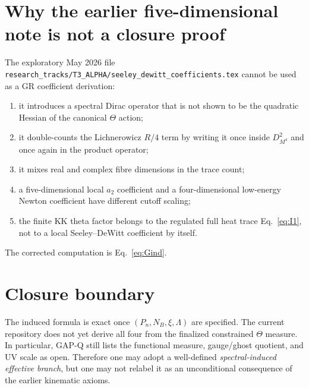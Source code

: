 \documentclass[11pt,a4paper]{article}
\begin{document}
\section{Why the earlier five-dimensional note is not a closure proof}
The exploratory May 2026 file
\texttt{research\_tracks/T3\_ALPHA/seeley\_dewitt\_coefficients.tex} cannot be
used as a GR coefficient derivation:
\begin{enumerate}
 \item it introduces a spectral Dirac operator that is not shown to be the
 quadratic Hessian of the canonical $\Theta$ action;
 \item it double-counts the Lichnerowicz $R/4$ term by writing it once inside
 $D_{M^4}^2$ and once again in the product operator;
 \item it mixes real and complex fibre dimensions in the trace count;
 \item a five-dimensional local $a_2$ coefficient and a four-dimensional
 low-energy Newton coefficient have different cutoff scaling;
 \item the finite KK theta factor belongs to the regulated full heat trace
 Eq.~\eqref{eq:I1}, not to a local Seeley--DeWitt coefficient by itself.
\end{enumerate}
The corrected computation is Eq.~\eqref{eq:Gind}.

\section{Closure boundary}
The induced formula is exact once $(P_n,N_B,\xi,\Lambda)$ are specified.  The
current repository does not yet derive all four from the finalized constrained
$\Theta$ measure.  In particular, GAP-Q still lists the functional measure,
gauge/ghost quotient, and UV scale as open.  Therefore one may adopt a
well-defined \emph{spectral-induced effective branch}, but one may not relabel
it as an unconditional consequence of the earlier kinematic axioms.
\end{document}
